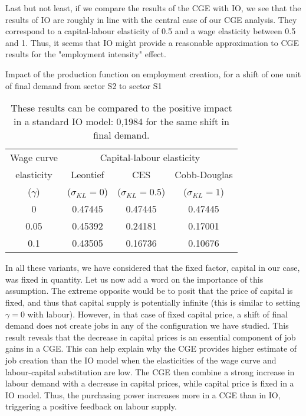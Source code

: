 Last but not least, if we compare the results of the CGE with IO, we see that the results of IO are roughly in line with the central case of our CGE analysis. They correspond to a capital-labour elasticity of 0.5 and a wage elasticity between 0.5 and 1. 
Thus, it seems that IO might provide a reasonable approximation to CGE results for the "employment intensity" effect.

\begin{table} [!h]
	\centering
	\caption{Impact of the production function on employment creation, for a shift of one unit of final demand from sector S2 to sector S1}
	\label{tab:employ_change_closed}
	\begin{tabular}{c|ccc}
		\toprule
		Wage curve & \multicolumn{3}{c}{Capital-labour elasticity} \\
		elasticity & Leontief & CES & Cobb-Douglas \\
		($\gamma$)  &($\sigma_{KL}=0$) & ($\sigma_{KL}=0.5$) & ($\sigma_{KL}=1$) \\
		\midrule
		0 			  & 0.47445 & 0.47445 & 0.47445 \\ 
		0.05		& 0.45392 & 0.24181 & 0.17001 \\
		0.1 	 	 & 0.43505 & 0.16736 & 0.10676 \\
		\bottomrule
	\end{tabular}
	\caption*{These results can be compared to the positive impact in a standard IO model: 0,1984 for the same shift in final demand.}
\end{table}

In all these variants, we have considered that the fixed factor, capital in our case, was fixed in quantity.
Let us now add a word on the importance of this assumption. The extreme opposite would be to posit that the price of capital is fixed, and thus that capital supply is potentially infinite (this is similar to setting $\gamma=0$ with labour).
However, in that case of fixed capital price, a shift of final demand does not create jobs in any of the configuration we have studied.
This result reveals that the decrease in capital prices is an essential component of job gains in a CGE.	
This can help explain why the CGE provides higher estimate of job creation than the IO model when the elasticities of the wage curve and labour-capital substitution are low. The CGE then combine a strong increase in labour demand with a decrease in capital prices, while capital price is fixed in a IO model. 
Thus, the purchasing power increases more in a CGE than in IO, triggering a positive feedback on labour supply.

